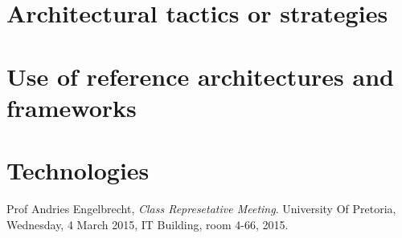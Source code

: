 \documentclass[a4paper,12pt]{report}
\begin{document}
\section{Architectural tactics or strategies}
	
\section{Use of reference architectures and frameworks}
	
\section{Technologies}
	
\begin{thebibliography}{9}
  Prof Andries Engelbrecht,
  \emph{Class Represetative Meeting}.
	University Of Pretoria,
	Wednesday, 4 March 2015,
	IT Building, room 4-66,
  	2015.
\end{thebibliography}
\end{document}
